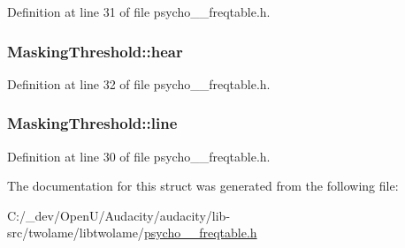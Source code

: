 Definition at line 31 of file psycho\+\_\+\_\+freqtable.\+h.

\subsubsection[{\texorpdfstring{hear}{hear}}]{ Masking\+Threshold\+::hear}\hypertarget{struct_masking_threshold_a46773c811aa0f6cf6ce5d684c6375784}{}\label{struct_masking_threshold_a46773c811aa0f6cf6ce5d684c6375784}


Definition at line 32 of file psycho\+\_\+\_\+freqtable.\+h.

\subsubsection[{\texorpdfstring{line}{line}}]{ Masking\+Threshold\+::line}\hypertarget{struct_masking_threshold_a0944679cd4b49d65cf43757d5b52d3d0}{}\label{struct_masking_threshold_a0944679cd4b49d65cf43757d5b52d3d0}


Definition at line 30 of file psycho\+\_\+\_\+freqtable.\+h.



The documentation for this struct was generated from the following file\+:\begin{DoxyCompactItemize}
\item 
C\+:/\+\_\+dev/\+Open\+U/\+Audacity/audacity/lib-\/src/twolame/libtwolame/\hyperlink{psycho__1__freqtable_8h}{psycho\+\_\+\_\+freqtable.\+h}\end{DoxyCompactItemize}
